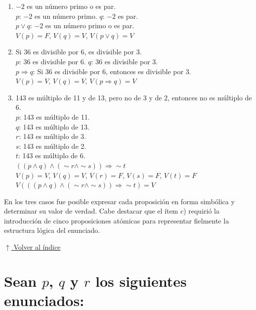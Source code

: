 \documentclass[12pt]{article}
\newcommand{\volverindice}{%
    \vspace{1em}%
    \begin{flushright}%
        \hyperlink{indice}{\small $\uparrow$ Volver al índice}%
    \end{flushright}%
}
\begin{document}
\begin{enumerate}[label=\alph*.-]
    \item $-2$ es un número primo o es par.\\
          $p$: $-2$ es un número primo. \quad $q$: $-2$ es par.\\
          $p \vee q$: $-2$ es un número primo o es par.\\
          $V(p) = F$, \quad $V(q) = V$, \quad $V(p \vee q) = V$

    \item Si 36 es divisible por 6, es divisible por 3.\\
          $p$: 36 es divisible por 6. \quad $q$: 36 es divisible por 3.\\
          $p \Rightarrow q$: Si 36 es divisible por 6, entonces es divisible por 3.\\
          $V(p) = V$, \quad $V(q) = V$, \quad $V(p \Rightarrow q) = V$

    \item 143 es múltiplo de 11 y de 13, pero no de 3 y de 2, entonces no es múltiplo de 6.\\
          $p$: 143 es múltiplo de 11.\\
          $q$: 143 es múltiplo de 13.\\
          $r$: 143 es múltiplo de 3.\\
          $s$: 143 es múltiplo de 2.\\
          $t$: 143 es múltiplo de 6.\\
          $((p \wedge q) \wedge (\sim r \wedge \sim s)) \Rightarrow \sim t$\\
          $V(p) = V$, \quad $V(q) = V$, \quad $V(r) = F$, \quad $V(s) = F$, \quad $V(t) = F$\\
          $V(((p \wedge q) \wedge (\sim r \wedge \sim s)) \Rightarrow \sim t) = V$
\end{enumerate}

En los tres casos fue posible expresar cada proposición en forma simbólica y determinar su valor de verdad. Cabe destacar que el ítem c) requirió la introducción de cinco proposiciones atómicas para representar fielmente la estructura lógica del enunciado.

\volverindice
\newpage


\section[Lenguaje coloquial desde fórmulas]{Sean $p$, $q$ y $r$ los siguientes enunciados:}
\end{document}
